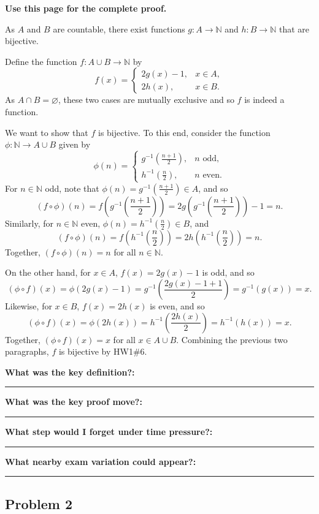 \documentclass[12pt]{article}
\newcommand{\N}{\mathbb{N}}
\newcommand{\writespace}[1]{\vspace*{#1}}
\newcommand{\fillfieldbig}[2]{%
  \par\noindent\textbf{#1:}\par
  \writespace{#2}
  \noindent\rule{\linewidth}{0.35pt}\par\vspace{0.15in}%
}
\newcommand{\fullproofpage}[2]{%
  \begin{tcolorbox}[
    enhanced,
    colback=white,
    colframe=gray!60!black,
    fonttitle=\bfseries,
    title={Pass 5 -- Full Proof Attempt\hfill #1},
    height=8.45in
  ]
  \textbf{#2}

  \writespace{7.65in}
  \end{tcolorbox}
}
\newenvironment{solutionbox}[1]{%
  \begin{tcolorbox}[
    enhanced,
    breakable,
    colback=solgreen,
    colframe=green!45!black,
    fonttitle=\bfseries,
    title={#1}
  ]
}{%
  \end{tcolorbox}
}
\newcommand{\reflectionpage}[1]{%
  \begin{tcolorbox}[
    enhanced,
    colback=reflectcyan,
    colframe=cyan!55!black,
    fonttitle=\bfseries,
    title={Reflection \& Variation\hfill #1},
    height=8.45in
  ]
  \fillfieldbig{What was the key definition?}{1.15in}
  \fillfieldbig{What was the key proof move?}{1.15in}
  \fillfieldbig{What step would I forget under time pressure?}{1.15in}
  \fillfieldbig{What nearby exam variation could appear?}{1.35in}
  \end{tcolorbox}
}
\begin{document}
\newpage
\fullproofpage{Homework 2, Problem 1}{Use this page for the complete proof.}

\newpage
\begin{solutionbox}{Official Solution (Professor)}
As \(A\) and \(B\) are countable, there exist functions \(g:A\to\N\) and \(h:B\to\N\) that are bijective.

Define the function \(f:A\cup B\to\N\) by
\[
  f(x)=
  \begin{cases}
    2g(x)-1, & x\in A,\\
    2h(x), & x\in B.
  \end{cases}
\]
As \(A\cap B=\varnothing\), these two cases are mutually exclusive and so \(f\) is indeed a function.

We want to show that \(f\) is bijective. To this end, consider the function \(\phi:\N\to A\cup B\) given by
\[
  \phi(n)=
  \begin{cases}
    g^{-1}\left(\frac{n+1}{2}\right), & n\text{ odd},\\
    h^{-1}\left(\frac n2\right), & n\text{ even}.
  \end{cases}
\]
For \(n\in\N\) odd, note that \(\phi(n)=g^{-1}\left(\frac{n+1}{2}\right)\in A\), and so
\[
  (f\circ\phi)(n)
  =
  f\left(g^{-1}\left(\frac{n+1}{2}\right)\right)
  =
  2g\left(g^{-1}\left(\frac{n+1}{2}\right)\right)-1
  =
  n.
\]
Similarly, for \(n\in\N\) even, \(\phi(n)=h^{-1}(\frac n2)\in B\), and
\[
  (f\circ\phi)(n)
  =
  f\left(h^{-1}\left(\frac n2\right)\right)
  =
  2h\left(h^{-1}\left(\frac n2\right)\right)
  =
  n.
\]
Together, \((f\circ\phi)(n)=n\) for all \(n\in\N\).

On the other hand, for \(x\in A\), \(f(x)=2g(x)-1\) is odd, and so
\[
  (\phi\circ f)(x)
  =
  \phi(2g(x)-1)
  =
  g^{-1}\left(\frac{2g(x)-1+1}{2}\right)
  =
  g^{-1}(g(x))
  =
  x.
\]
Likewise, for \(x\in B\), \(f(x)=2h(x)\) is even, and so
\[
  (\phi\circ f)(x)
  =
  \phi(2h(x))
  =
  h^{-1}\left(\frac{2h(x)}{2}\right)
  =
  h^{-1}(h(x))
  =
  x.
\]
Together, \((\phi\circ f)(x)=x\) for all \(x\in A\cup B\). Combining the previous two paragraphs, \(f\) is bijective by HW1\#6.
\end{solutionbox}

\newpage
\reflectionpage{Homework 2, Problem 1}

\newpage
\subsection{Problem 2}
\end{document}
